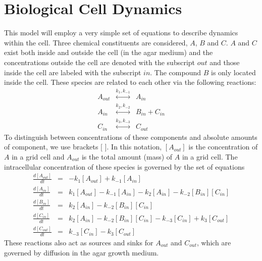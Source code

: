 \documentclass[12pt]{article}
\begin{document}
\section{Biological Cell Dynamics}
This model will employ a very simple set of equations to describe dynamics within the
cell. Three chemical constituents are considered, $A$, $B$ and $C$. $A$ and $C$ exist
both inside and outside the cell (in the agar medium) and the concentrations outside
the cell are denoted with the subscript $out$ and those inside the cell are labeled
with the subscript $in$. The compound $B$ is only located inside the cell.
These species are related to each other via the following reactions:
\begin{eqnarray*}
A_{out} &\stackrel{k_{1},k_{-1}}{\longleftrightarrow}& A_{in} \\
A_{in} &\stackrel{k_2,k_{-2}}{\longleftrightarrow}& B_{in} + C_{in} \\
C_{in} &\stackrel{k_3,k_{-3}}{\longleftrightarrow}& C_{out}
\end{eqnarray*}
To distinguish
between concentrations of these components and absolute amounts of component, we use
brackets [ ]. In this notation, $[A_{out}]$ is the concentration of $A$ in a grid cell and
$A_{out}$ is the total amount (mass) of $A$ in a grid cell.
The intracellular concentration of these species is governed by the set of equations
\begin{eqnarray*}
\frac{d [A_{out}]}{d t} &=&-k_1 [A_{out}]+k_{-1} [A_{in}] \\
\frac{d [A_{in}]}{d t} &=&k_1 [A_{out}]-k_{-1} [A_{in}] - k_2 [A_{in}]
 - k_{-2}[B_{in}][C_{in}]\\
\frac{d [B_{in}]}{d t} &=&k_2 [A_{in}] - k_{-2}[B_{in}][C_{in}]\\
\frac{d [C_{in}]}{d t} &=&k_2 [A_{in}] - k_{-2}[B_{in}][C_{in}]-k_{-3} [C_{in}]
+ k_3 [C_{out}] \\
\frac{d [C_{out}]}{d t} &=&k_{-3} [C_{in}]-k_3 [C_{out}]
\end{eqnarray*}
These reactions also act as sources and sinks for $A_{out}$ and $C_{out}$, which are governed
by diffusion in the agar growth medium.
\end{document}
